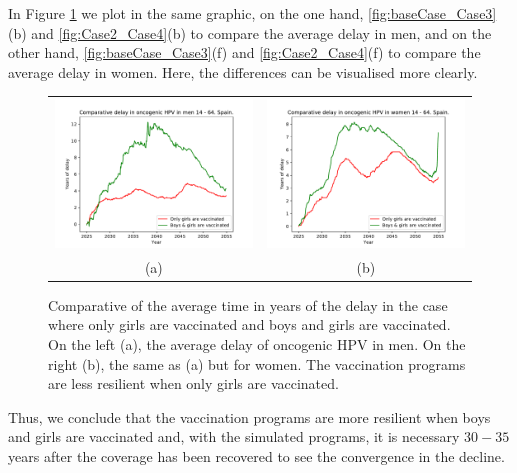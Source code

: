 In Figure \ref{fig:compara_resilencia} we plot in the same graphic, on the one hand,  \ref{fig:baseCase_Case3}(b) and \ref{fig:Case2_Case4}(b) to compare the average delay in men, and on the other hand, \ref{fig:baseCase_Case3}(f) and \ref{fig:Case2_Case4}(f) to compare the average delay in women. Here, the differences can be visualised more clearly.

\begin{figure}[!]
	\centering
	\begin{tabular}{cc}
		\includegraphics[width=0.5\linewidth]{IMGs/11.-Resilencia/compara_resilencia_onco_hom.pdf}	& 
		\includegraphics[width=0.5\linewidth]{IMGs/11.-Resilencia/compara_resilencia_onco_muj.pdf}  \\ 
		(a)	& (b) \\ 
	\end{tabular} 
	\caption{Comparative of the average time in years of the delay in the case where only girls are vaccinated and boys and girls are vaccinated. On the left (a), the average delay of oncogenic HPV in men. On the right (b), the same as (a) but for women. The vaccination programs are less resilient when only girls are vaccinated.}
	\label{fig:compara_resilencia}
\end{figure}

Thus, we conclude that the vaccination programs are more resilient when boys and girls are vaccinated and, with the simulated programs, it is necessary $30-35$ years after the coverage has been recovered to see the convergence in the decline.
